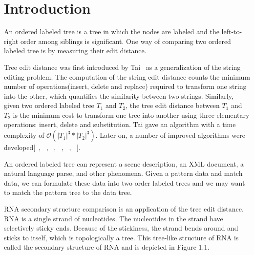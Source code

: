 \doublespacing
\chapter{Introduction}
An ordered labeled tree is a tree in which the nodes are labeled and the left-to-right order among siblings is significant. One way of comparing two ordered labeled tree is by measuring their edit distance. 

Tree edit distance was first introduced by Tai~\cite{tai1979tree} as a generalization of the string editing problem. The computation of the string edit distance counts the minimum number of operations(insert, delete and replace) required to transform one string into the other, which quantifies the similarity between two strings. Similarly, given two ordered labeled tree $T_1$ and $T_2$, the tree edit distance between $T_1$ and $T_2$ is the minimum cost to transform one tree into another using three elementary operations: insert, delete and substitution. Tai gave an algorithm with a time complexity of $\mathcal{O}(\left\vert T_1 \right\vert^3 * \left\vert T_2 \right\vert^3)$. Later on, a number of improved algorithms were developed[~\cite{zhang1989simple}, ~\cite{klein1998computing}, ~\cite{dulucq2005decomposition}, ~\cite{demaine2009optimal}, ~\cite{Chen2014}, ~\cite{pawlik2015efficient}].

An ordered labeled tree can represent a scene description, an XML document, a natural language parse, and other phenomena. Given a pattern data and match data, we can formulate these data into two order labeled trees and we may want to match the pattern tree to the data tree.

RNA secondary structure comparison is an application of the tree edit distance. RNA is a single strand of nucleotides. The nucleotides in the strand have selectively sticky ends. Because of the stickiness, the strand bends around and sticks to itself, which is topologically a tree. This tree-like structure of RNA is called the secondary structure of RNA and is depicted in Figure 1.1. 


